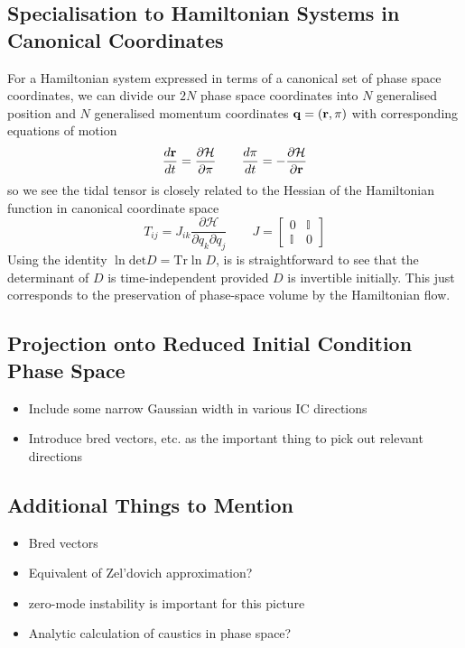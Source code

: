 \subsection{Specialisation to Hamiltonian Systems in Canonical Coordinates}
For a Hamiltonian system expressed in terms of a canonical set of phase space coordinates, we can divide our $2N$ phase space coordinates into $N$ generalised position and $N$ generalised momentum coordinates ${\bf q} = \left({\bf r},{\bf \pi}\right)$ with corresponding equations of motion
\begin{equation}
  \frac{d {\bf r}}{dt} = \frac{\partial\mathcal{H}}{\partial {\bf \pi}} \qquad \frac{d{\bf \pi}}{dt} = -\frac{\partial \mathcal{H}}{\partial {\bf r}}
\end{equation}
so we see the tidal tensor is closely related to the Hessian of the Hamiltonian function in canonical coordinate space
\begin{equation}
  T_{ij} = J_{ik} \frac{\partial \mathcal{H}}{\partial q_k\partial q_j} \qquad J = \left[\begin{array}{cc} 0 & \mathbb{I} \\ \mathbb{I} & 0 \end{array}\right]
\end{equation}
Using the identity $\ln\mathrm{det}D = \mathrm{Tr}\ln D$, is is straightforward to see that the determinant of $D$ is time-independent provided $D$ is invertible initially.
This just corresponds to the preservation of phase-space volume by the Hamiltonian flow.

\subsection{Projection onto Reduced Initial Condition Phase Space}
\begin{itemize}
\item Include some narrow Gaussian width in various IC directions
\item Introduce bred vectors, etc. as the important thing to pick out relevant directions
\end{itemize}

\subsection{Additional Things to Mention}
\begin{itemize}
\item Bred vectors
\item Equivalent of Zel'dovich approximation?
\item zero-mode instability is important for this picture
\item Analytic calculation of caustics in phase space?
\end{itemize}

